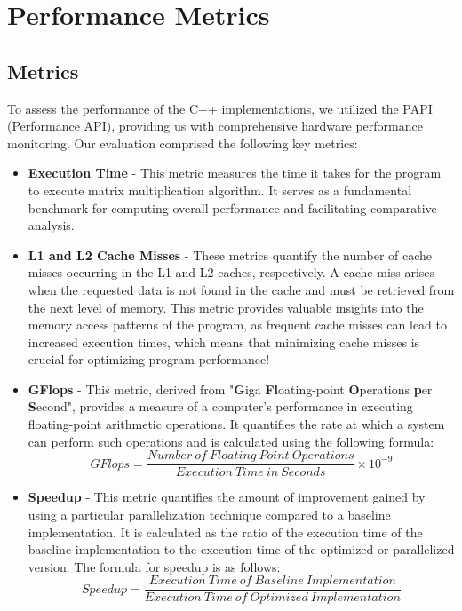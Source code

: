\section{Performance Metrics}
\label{sec:metrics}

\subsection{Metrics}
To assess the performance of the C++ implementations, we
utilized the PAPI (Performance API), providing us with comprehensive
hardware performance monitoring. Our evaluation comprised the
following key metrics:

\begin{itemize}
    \item \textbf{Execution Time} - This metric measures the time it takes for the program to execute matrix multiplication algorithm. 
          It serves as a fundamental
          benchmark for computing overall performance
          and facilitating comparative analysis.

    \item \textbf{L1 and L2 Cache Misses} - These metrics quantify the number 
        of cache misses occurring in the L1 and L2 caches, respectively. 
        A cache miss arises when the requested data is not found in the cache 
        and must be retrieved from the next level of memory. This metric
          provides valuable insights into the memory access patterns
          of the program, as frequent cache misses can lead to
          increased execution times, which means that
          minimizing cache misses is crucial for optimizing
          program performance!

    \item \textbf{GFlops} - This metric, derived from "\textbf{G}iga
          \textbf{Fl}oating-point \textbf{O}perations \textbf{p}er \textbf{S}econd", provides a measure of a
          computer's performance in executing floating-point arithmetic
          operations. It quantifies the rate at which a system can
          perform such operations and is calculated using the following formula:
          \begin{equation}
              GFlops = \frac{Number\ of\ Floating\ Point\ Operations}{Execution\ Time\ in\ Seconds} \times 10^{-9}
          \end{equation}

    \item \textbf{Speedup} - This metric quantifies the
          amount of improvement gained by using a particular
          parallelization technique compared to a baseline
          implementation. It is calculated as the ratio of
          the execution time of the baseline implementation
          to the execution time of the optimized or parallelized
          version. The formula for speedup is as follows:
          \begin{equation}
              Speedup = \frac{Execution\ Time\ of\ Baseline\ Implementation}{Execution\ Time\ of\ Optimized\ Implementation}
          \end{equation}



\end{itemize}
